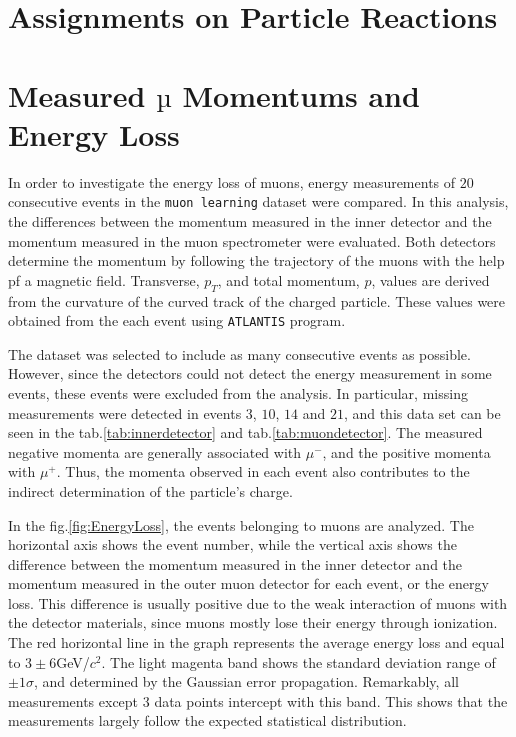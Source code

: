 \section{Assignments on Particle Reactions}

\section{Measured $µ$ Momentums and Energy Loss}
\label{sec:muonmom}

In order to investigate the energy loss of muons, energy measurements of $20$ consecutive events in the
\texttt{muon learning} dataset were compared. In this analysis, the differences between the momentum
measured in the inner detector and the momentum measured in the muon spectrometer were
evaluated. Both detectors determine the momentum by following the trajectory of the muons with the
help pf a magnetic field. Transverse, $p_T$, and total momentum, $p$, values are derived from the
curvature of the curved track of the charged particle. These values were obtained from the each event
using \texttt{ATLANTIS} program.

The dataset was selected to include as many consecutive events as possible. However, since the detectors could not detect the energy measurement in some events, these events were excluded from the analysis. In particular, missing measurements were detected in events $3$, $10$, $14$ and $21$, and this data set can be seen in the tab.\ref{tab:innerdetector} and tab.\ref{tab:muondetector}. The measured negative momenta are generally associated with $\mu^-$, and the positive momenta with $\mu^+$. Thus, the momenta observed in each event also contributes to the indirect determination of the particle’s charge.

In the fig.\ref{fig:EnergyLoss}, the events belonging to muons are analyzed. The horizontal axis shows the event number, while the vertical axis shows the difference between the momentum measured in the inner detector and the momentum measured in the outer muon detector for each event, or the energy loss. This difference is usually positive due to the weak interaction of muons with the detector materials, since muons mostly lose their energy through ionization. The red horizontal line in the graph represents the average energy loss and equal to $3\pm6$GeV/$c^2$. The light magenta band shows the standard deviation range of $\pm1\sigma$, and determined by the Gaussian error propagation. Remarkably, all measurements except $3$ data points intercept with this band. This shows that the measurements largely follow the expected statistical distribution.

